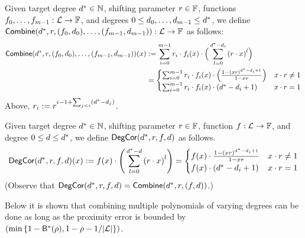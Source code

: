 \begin{definition}\label{def:combine}
    Given target degree $d^*\in\mathbb{N}$, shifting parameter $r\in\mathbb{F}$, functions $f_0,\ldots,f_{m-1}:\mathcal{L}\rightarrow\mathbb{F}$, and degrees $0\leq d_0,\ldots,d_{m-1}\leq {d}^*$, we define $\mathsf{Combine}(d^*,r,(f_0,d_0),\ldots,(f_{m-1},d_{m-1})):\mathcal{L}\rightarrow\mathbb{F}$ as follows:
    \begin{align*}
        \mathsf{Combine}({d}^*,r,(f_0,d_0),\ldots,(f_{m-1},d_{m-1}))(x)&:=\sum_{i=0}^{m-1}r_i\cdot f_i(x)\cdot \Big(\sum_{l=0}^{d^*-d_i}{(r\cdot x)}^l\Big) \\
        &= 
        \begin{cases}
            \sum_{i=0}^{m-1}r_i\cdot f_i(x)\cdot \Big(\frac{1-{(xr)}^{d^*-d_i+1}}{1-xr}\Big) & x\cdot r\neq 1\\
            \sum_{i=0}^{m-1}r_i\cdot f_i(x)\cdot (d^*-d_i+1) & x\cdot r= 1
        \end{cases}
    \end{align*}
Above, $r_i:=r^{i-1+\sum_{j<i}(d^*-d_j)}$.
\end{definition}

\begin{definition}\label{def:deg_corr}
    Given target degree $d^*\in\mathbb{N}$, shifting parameter $r\in\mathbb{F}$, function $f:\mathcal{L}\rightarrow\mathbb{F}$, and degree $0\leq d\leq d^*$, we define $\mathsf{DegCor}(d^*,r,f,d)$ as follows.
    \[
        \mathsf{DegCor}(d^*,r,f,d)(x):=f(x)\cdot\Bigg(\sum_{l=0}^{d^*-d}{(r\cdot x)}^l\Bigg)=
        \begin{cases}
            f(x)\cdot\frac{1-{(xr)}^{d^*-d_i+1}}{1-xr} & x\cdot r\neq 1\\
            f(x)\cdot (d^*-d_i+1) & x\cdot r = 1
        \end{cases}
    \]
(Observe that $\mathsf{DegCor}(d^*,r,f,d)=\mathsf{Combine}(d^*,r,(f,d))$.)
\end{definition}

Below it is shown that combining multiple polynomials of varying degrees can be done as long as the proximity error is bounded by $(\min{\{1-{\mathsf{B}}^*(\rho),1-\rho-1/|\mathcal{L}|\}})$.

